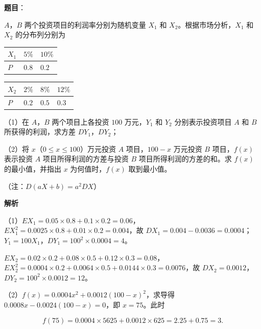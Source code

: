 \begin{answer}

\textbf{题目}：

$A$，$B$ 两个投资项目的利润率分别为随机变量 $X_1$ 和 $X_2$。根据市场分析，$X_1$ 和 $X_2$ 的分布列分别为

\begin{center}
\begin{tabular}{lll}
\toprule
$X_1$ & $5\%$ & $10\%$ \\
\midrule
$P$ & $0.8$ & $0.2$ \\
\bottomrule
\end{tabular}
\end{center}

\begin{center}
\begin{tabular}{llll}
\toprule
$X_2$ & $2\%$ & $8\%$ & $12\%$ \\
\midrule
$P$ & $0.2$ & $0.5$ & $0.3$ \\
\bottomrule
\end{tabular}
\end{center}

（1）在 $A$，$B$ 两个项目上各投资 $100$ 万元，$Y_1$ 和 $Y_2$ 分别表示投资项目 $A$ 和 $B$ 所获得的利润，求方差 $DY_1$，$DY_2$；

（2）将 $x$（$0\leqslant x\leqslant100$）万元投资 $A$ 项目，$100-x$ 万元投资 $B$ 项目，$f(x)$ 表示投资 $A$ 项目所得利润的方差与投资 $B$ 项目所得利润的方差的和。求 $f(x)$ 的最小值，并指出 $x$ 为何值时，$f(x)$ 取到最小值。

（注：$D(aX+b)=a^2DX$）

\textbf{解析}

（1）$EX_1=0.05\times0.8+0.1\times0.2=0.06$，$EX_1^2=0.0025\times0.8+0.01\times0.2=0.004$，故 $DX_1=0.004-0.0036=0.0004$；$Y_1=100X_1$，$DY_1=100^2\times0.0004=4$。

$EX_2=0.02\times0.2+0.08\times0.5+0.12\times0.3=0.08$，$EX_2^2=0.0004\times0.2+0.0064\times0.5+0.0144\times0.3=0.0076$，故 $DX_2=0.0012$，$DY_2=100^2\times0.0012=12$。

（2）$f(x)=0.0004x^2+0.0012(100-x)^2$，求导得 $0.0008x-0.0024(100-x)=0$，即 $x=75$。此时

\nopagebreak[4]
\[f(75)=0.0004\times5625+0.0012\times625=2.25+0.75=3.\]


\end{answer}
